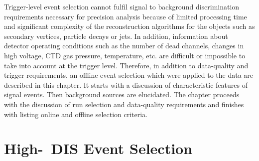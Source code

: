 Trigger-level event selection cannot fulfil signal to background discrimination requirements necessary for precision analysis because of limited processing time and significant complexity of the reconstruction algorithms for the objects such as secondary vertices, particle decays or jets. In addition, information about detector operating conditions such as the number of dead channels, changes in high voltage, CTD gas pressure, temperature, etc. are difficult or impossible to take into account at the trigger level. Therefore, in addition to data-quality and trigger requirements, an offline event selection which were applied to the data are described in this chapter. It starts with a discussion of characteristic features of signal events. Then background sources are elucidated. The chapter proceeds with the discussion of run selection and data-quality requirements and finishes with listing online and offline selection criteria.

\section{High-\qsq\, DIS Event Selection}
\label{sec:dissel}

